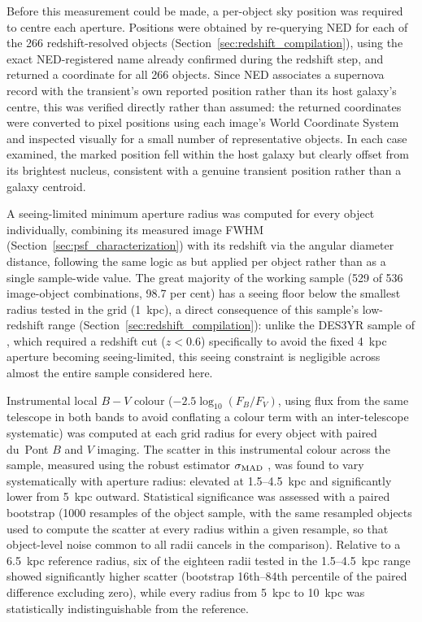 \documentclass[12pt]{article}
\begin{document}
Before this measurement could be made, a per-object sky position was required to centre each aperture. Positions were obtained by re-querying NED for each of the 266 redshift-resolved objects (Section~\ref{sec:redshift_compilation}), using the exact NED-registered name already confirmed during the redshift step, and returned a coordinate for all 266 objects. Since NED associates a supernova record with the transient's own reported position rather than its host galaxy's centre, this was verified directly rather than assumed: the returned coordinates were converted to pixel positions using each image's World Coordinate System and inspected visually for a small number of representative objects. In each case examined, the marked position fell within the host galaxy but clearly offset from its brightest nucleus, consistent with a genuine transient position rather than a galaxy centroid.

A seeing-limited minimum aperture radius was computed for every object individually, combining its measured image FWHM (Section~\ref{sec:psf_characterization}) with its redshift via the angular diameter distance, following the same logic as \citet{Kelsey2021} but applied per object rather than as a single sample-wide value. The great majority of the working sample (529 of 536 image-object combinations, 98.7 per cent) has a seeing floor below the smallest radius tested in the grid (1~kpc), a direct consequence of this sample's low-redshift range (Section~\ref{sec:redshift_compilation}): unlike the DES3YR sample of \citet{Kelsey2021}, which required a redshift cut ($z < 0.6$) specifically to avoid the fixed 4~kpc aperture becoming seeing-limited, this seeing constraint is negligible across almost the entire sample considered here.

Instrumental local $B-V$ colour ($-2.5\log_{10}(F_B/F_V)$, using flux from the same telescope in both bands to avoid conflating a colour term with an inter-telescope systematic) was computed at each grid radius for every object with paired du~Pont $B$ and $V$ imaging. The scatter in this instrumental colour across the sample, measured using the robust estimator $\sigma_{\rm MAD}$ \citep[implemented via \texttt{astropy.stats.mad\_std};][]{astropy2013}, was found to vary systematically with aperture radius: elevated at 1.5--4.5~kpc and significantly lower from 5~kpc outward. Statistical significance was assessed with a paired bootstrap (1000 resamples of the object sample, with the same resampled objects used to compute the scatter at every radius within a given resample, so that object-level noise common to all radii cancels in the comparison). Relative to a 6.5~kpc reference radius, six of the eighteen radii tested in the 1.5--4.5~kpc range showed significantly higher scatter (bootstrap 16th--84th percentile of the paired difference excluding zero), while every radius from 5~kpc to 10~kpc was statistically indistinguishable from the reference.
\end{document}
